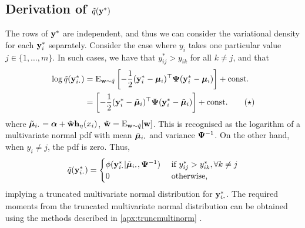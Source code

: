 \subsection{Derivation of \texorpdfstring{$\tilde q({\mathbf y}^*)$}{$\tilde q(y^*)$}}

The rows of ${\mathbf y}^*$ are independent, and thus we can consider the variational density for each ${\mathbf y}_i^*$ separately.
Consider the case where $y_i$ takes one particular value $j \in \{1,\dots,m\}$. 
In such cases, we have that $y_{ij}^* > y_{ik}$ for all $k\neq j$, and that
\begin{align*}
  \log \tilde q(\by_{i \bigcdot}^*) 
  &=  \E_{\bw\sim \tilde q} \left[ - \half (\by^*_i - \bmu_i)^\top \bPsi (\by^*_i - \bmu_i)  \right] + \const \\
  &= \left[ - \half (\by^*_i - \tilde\bmu_i)^\top \bPsi (\by^*_i - \tilde\bmu_i)  \right] + \const \tag{$\star$} 
\end{align*}
where $\tilde\bmu_{i \bigcdot} = \balpha + \tilde\bw\bh_\eta(x_i)$,  $\tilde{{\mathbf w}} = \operatorname{E}_{{\mathbf w}\sim\tilde q}[{\mathbf w}]$.
This is recognised as the logarithm of a multivariate normal pdf with mean $\tilde \bmu_{i \bigcdot}$ and variance ${\bm\Psi}^{-1}$.
On the other hand, when $y_i \neq j$, the pdf is zero.
Thus,
\begin{align*}
  \tilde q(\by_{i \bigcdot}^*) =
  \begin{cases}
    \phi(\by_{i \bigcdot}^*|\tilde\bmu_{i \bigcdot},\bPsi^{-1}) & \text{ if } y_{ij}^* > y_{ik}^*, \forall k \neq j \\
    0 & \text{ otherwise,} \\
  \end{cases}
\end{align*}
implying a truncated multivariate normal distribution for $\by_{i \bigcdot}^*$.
The required moments from the truncated multivariate normal distribution can be obtained using the methods described in \cref{apx:truncmultinorm} .


